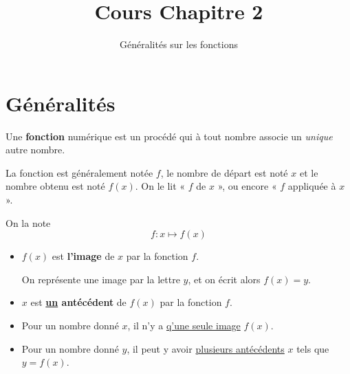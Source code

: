\documentclass[
	classe=$1^{ere}$STI2D
]{coursclass}
\title{Cours Chapitre 2}
\author{Généralités sur les fonctions}
\date{}
\begin{document}
\maketitle

\section{Généralités}

\begin{definition}[Fonction]
	Une \textbf{fonction} numérique est un procédé qui à tout nombre associe un \textit{unique} autre nombre.

	La fonction est généralement notée $f$, le nombre de départ est noté $x$ et le nombre obtenu est noté $f(x)$. On le lit « $f$ de $x$ », ou encore « $f$ appliquée à $x$ ».

	On la note
	$$ f : x ↦ f(x) $$

	\begin{itemize}
		\item $f(x)$ est \textbf{l'image} de $x$ par la fonction $f$.

		      On représente une image par la lettre $y$, et on écrit alors \uline{$f(x) = y$}.
		\item $x$ est \textbf{\uline{un} antécédent} de $f(x)$ par la fonction $f$.
	\end{itemize}
\end{definition}

\begin{remarque}
	\begin{itemize}
		\item Pour un nombre donné $x$, il n'y a \uline{q'une seule image} $f(x)$.
		\item Pour un nombre donné $y$, il peut y avoir \uline{plusieurs antécédents} $x$ tels que $y = f(x)$.
	\end{itemize}
\end{remarque}
\end{document}
